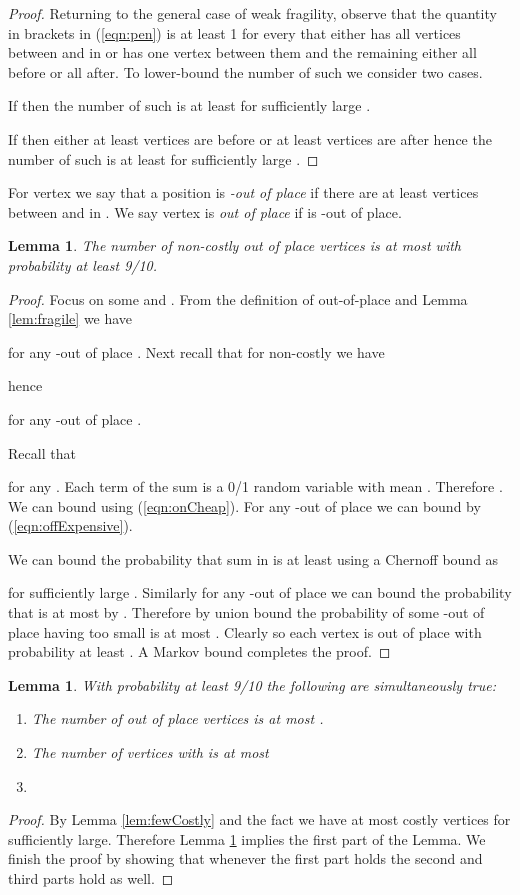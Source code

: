 \documentclass[dvips,11pt,letter]{article}
\newtheorem{lemma}[theorem]{Lemma}
\begin{document}
{\begin{proof}
Returning to the general case of weak fragility, observe that the quantity in brackets in (\ref{eqn:pen}) is at least 1 for every  that either has all  vertices between  and  in  or has one vertex between them and the remaining  either all before or all after. To lower-bound the number of such  we consider two cases.

If  then the number of such  is at least  for sufficiently large .

If  then either at least  vertices are before or at least  vertices are after hence the number of such  is at least 
 for sufficiently large .
\end{proof}


For vertex  we say that a position  is  \emph{-out of place} if there are at least  vertices between  and  in . We say vertex  is \emph{out of place} if  is -out of place.

\begin{lemma}\label{lem:random}
The number of non-costly out of place vertices is at most  with probability at least 9/10.
\end{lemma}

\begin{proof}Focus on some  and . From the definition of out-of-place and Lemma \ref{lem:fragile} we have

for any -out of place . Next recall that for non-costly  we have

hence 

for any -out of place .

Recall that

for any . Each term of the sum is a 0/1 random variable with mean . Therefore . We can bound  using (\ref{eqn:onCheap}). For any -out of place  we can bound  by (\ref{eqn:offExpensive}).

We can bound the probability that sum in  is at least  using a Chernoff bound as 

for sufficiently large . Similarly for any -out of place  we can bound the probability that  is at most  by .  Therefore by union bound the probability of some -out of place  having  too small is at most . Clearly  so each vertex  is out of place with probability at least . A Markov bound completes the proof.
\end{proof}

\begin{lemma}\label{lem:piOne}
With probability at least 9/10 the following are simultaneously true:
\begin{enumerate}
\item The number of out of place vertices is at most .
\item The number of vertices  with  is at most 
\item 
\end{enumerate}
\end{lemma}
\begin{proof}
By Lemma \ref{lem:fewCostly} and the fact  we have at most  costly vertices for   sufficiently large. Therefore Lemma \ref{lem:random} implies the first part of the Lemma. We finish the proof by showing that whenever the first part holds the second and third parts hold as well.


\end{proof}}
\end{document}
